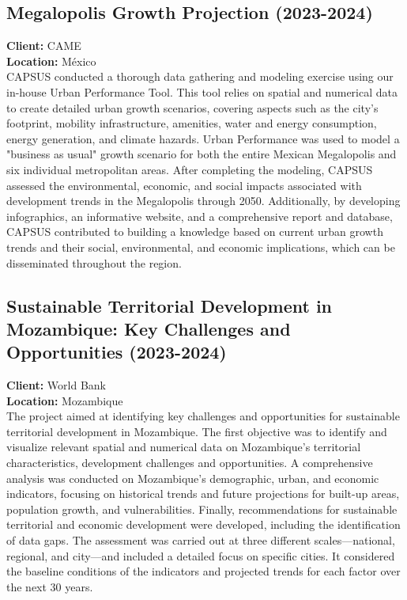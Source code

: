 \documentclass[
	a4paper,
	12pt,
	unnumberedsections,
]{CSSullivanBusinessReport}
\begin{document}
\subsection{Megalopolis Growth Projection (2023-2024)}
\textbf{Client:}  CAME \\
\textbf{Location:}  México \\[0.5em]
 CAPSUS conducted a thorough data gathering and modeling exercise using our in-house Urban Performance Tool. This tool relies on spatial and numerical data to create detailed urban growth scenarios, covering aspects such as the city's footprint, mobility infrastructure, amenities, water and energy consumption, energy generation, and climate hazards. Urban Performance was used to model a "business as usual" growth scenario for both the entire Mexican Megalopolis and six individual metropolitan areas. After completing the modeling, CAPSUS assessed the environmental, economic, and social impacts associated with development trends in the Megalopolis through 2050. Additionally, by developing infographics, an informative website, and a comprehensive report and database, CAPSUS contributed to building a knowledge based on current urban growth trends and their social, environmental, and economic implications, which can be disseminated throughout the region.

\subsection{Sustainable Territorial Development in Mozambique: Key Challenges and Opportunities (2023-2024)}
\textbf{Client:}   World Bank \\
\textbf{Location:}  Mozambique \\[0.5em]
 The project aimed at identifying key challenges and opportunities for sustainable territorial development in Mozambique. The first objective was to identify and visualize relevant spatial and numerical data on Mozambique’s territorial characteristics, development challenges and opportunities. A comprehensive analysis was conducted on Mozambique’s demographic, urban, and economic indicators, focusing on historical trends and future projections for built-up areas, population growth, and vulnerabilities. Finally, recommendations for sustainable territorial and economic development were developed, including the identification of data gaps. The assessment was carried out at three different scales—national, regional, and city—and included a detailed focus on specific cities. It considered the baseline conditions of the indicators and projected trends for each factor over the next 30 years.
\end{document}
